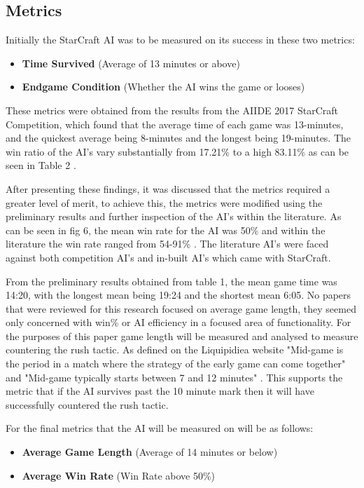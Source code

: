 \documentclass[journal]{IEEEtran}
\begin{document}
\subsection{Metrics}

Initially the StarCraft AI was to be measured on its success in these two metrics:
\begin{itemize}
	\item \textbf{Time Survived} (Average of 13 minutes or above)
	\item \textbf{Endgame Condition} (Whether the AI wins the game or looses)
\end{itemize}
These metrics were obtained from the results from the AIIDE 2017 StarCraft Competition, which found that the average time of each game was 13-minutes, and the quickest average being 8-minutes and the longest being 19-minutes. The win ratio of the AI's vary substantially from 17.21\% to a high 83.11\% as can be seen in Table 2 \cite{Results}. 

After presenting these findings, it was discussed that the metrics required a greater level of merit, to achieve this, the metrics were modified using the preliminary results and further inspection of the AI's within the literature. As can be seen in fig 6, the mean win rate for the AI was 50\% and within the literature the win rate ranged from 54-91\% \cite{ELGoal,Swen,OnlineEvo,GoalDriven}. The literature AI's were faced against both competition AI's and in-built AI's which came with StarCraft.

From the preliminary results obtained from table 1, the mean game time was 14:20, with the longest mean being 19:24 and the shortest mean 6:05. No papers that were reviewed for this research focused on average game length, they seemed only concerned with win\% or AI efficiency in a focused area of functionality. For the purposes of this paper game length will be measured and analysed to measure countering the rush tactic. As defined on the Liquipidiea website "Mid-game is the period in a match where the strategy of the early game can come together" and "Mid-game typically starts between 7 and 12 minutes" \cite{Liqui}. This supports the metric that if the AI survives past the 10 minute mark then it will have successfully countered the rush tactic. 
\newline

For the final metrics that the AI will be measured on will be as follows:
\begin{itemize}
	\item \textbf{Average Game Length} (Average of 14 minutes or below)
	\item \textbf{Average Win Rate} (Win Rate above 50\%)
\end{itemize}
\end{document}
